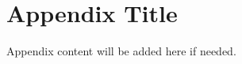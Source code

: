 \setlength{\footskip}{8mm}

\chapter{Appendix Title}
\label{app:appendix-title}

Appendix content will be added here if needed.
